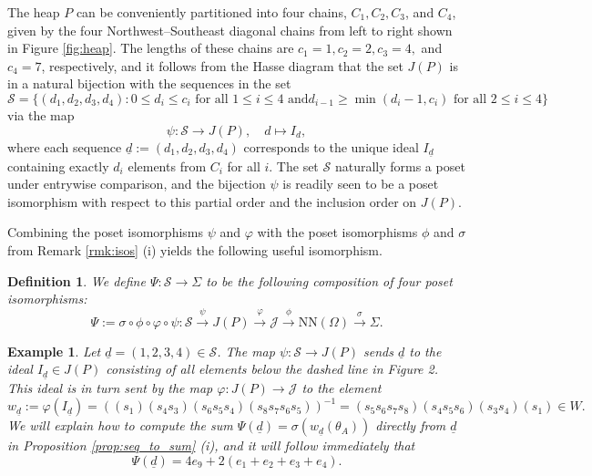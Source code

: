 \documentclass[10pt,a4paper]{amsart}
\newtheorem{defn}[theorem]{Definition}
\newtheorem{exa}[theorem]{Example}
\numberwithin{equation}{section}
\newcommand{\ra}{\rightarrow}
\newcommand{\seqd}{\underline{d}}
\newcommand{\calj}{\mathcal{J}}
\newcommand{\cals}{\mathcal{S}}
\newcommand{\ob}{\Omega}
\newcommand{\nn}{\mathrm{NN}}
\newcommand{\inverse}{^{-1}}
\begin{document}
The heap $P$ can be conveniently partitioned into four chains, $C_1, C_2, C_3$,
and $C_4$, given by the four Northwest--Southeast diagonal chains from left to
right shown in Figure \ref{fig:heap}. The lengths of these chains are $c_1=1,
c_2=2, c_3=4,$ and $c_4=7$, respectively, and it follows from the Hasse diagram
that the set $J(P)$ is in a natural bijection with the sequences in the set 
\begin{equation}
\label{eq:seqs}
\cals=\{(d_1,d_2,d_3,d_4): 0 \le d_i\le c_i \text{ for all $1\le i\le 4$ and
$d_{i-1}\ge \min(d_i-1,c_i)$ for all $2\le i \le 4$}\}
\end{equation}
via the map 
\begin{equation}
\label{eq:seq_to_ideal}
\psi: \cals \ra J(P), \quad d\mapsto I_d,
\end{equation}
where each sequence $\seqd:=(d_1,d_2,d_3,d_4)$ corresponds to the unique ideal
$I_{\seqd}$
containing exactly $d_i$ elements from $C_i$ for all $i$. The set $\cals$ naturally forms a poset under entrywise
comparison, and the bijection $\psi$ is readily seen to be a poset isomorphism
with respect to this partial order and the inclusion order on $J(P)$.

Combining the poset isomorphisms $\psi$ and $\varphi$ with the poset isomorphisms
$\phi$ and $\sigma$ from Remark \ref{rmk:isos} (i) yields the following 
useful isomorphism.

\begin{defn}
\label{defn:iso_chain}
We define $\Psi: \cals\ra \Sigma$ to be the following composition of four poset
isomorphisms:
\begin{equation}
\label{eq:iso_chain}
 \Psi:= \sigma\circ \phi\circ \varphi\circ \psi: \cals\stackrel{\psi}{\ra} J(P) \stackrel{\varphi}{\ra} \calj
  \stackrel{\phi}{\ra} \nn(\ob)\stackrel{\sigma}{\ra} \Sigma.
\end{equation}
\end{defn}


\begin{exa}
\label{exa:bijections}
Let $\seqd=(1,2,3,4)\in \cals$. The map $\psi:\cals\ra J(P)$ sends $\seqd$ to the ideal
$I_{\seqd}\in J(P)$ consisting of all elements below the dashed line in Figure 2. This
ideal is in turn sent by the map $\varphi: J(P)\ra \calj$ to the element 
  \[ 
    w_{\seqd}:=\varphi(I_{\seqd})=  ((s_1)(s_4s_3)(s_6s_5s_4)(s_8s_7s_6s_5))\inverse=(s_5s_6s_7s_8)(s_4s_5s_6)(s_3s_4)(s_1)\in
W. \] 
We will explain how to compute the sum $\Psi(\seqd)=\sigma(w_{\seqd}(\theta_A))$
directly from $\seqd$ in
Proposition \ref{prop:seq_to_sum} (i), and it will follow immediately that  
\begin{equation}
\label{eq:max_fob_sum}
\Psi(\seqd)
=4e_9+2(e_1+e_2+e_3+e_4). 
\end{equation}
\end{exa}
\end{document}
